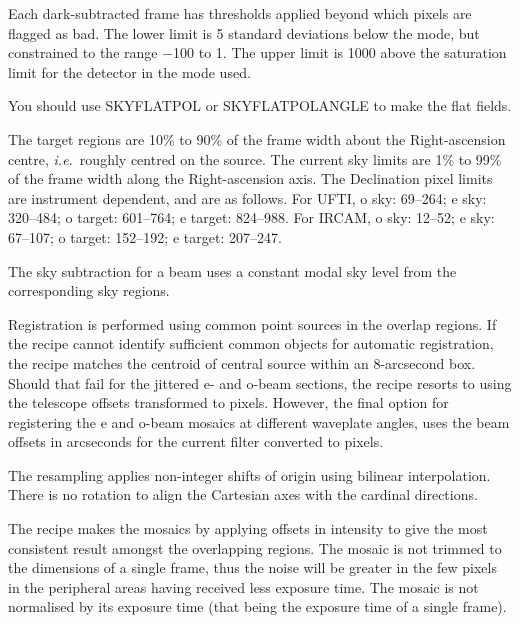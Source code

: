 \documentclass[twoside,11pt]{article}
\newcommand{\htmlref}[2]{#1}
\renewcommand{\_}{\texttt{\symbol{95}}}
\newcommand{\sstitem}{\item}
\begin{document}
{{{         \sstitem
         Each dark-subtracted frame has thresholds applied beyond which
         pixels are flagged as bad.  The lower limit is 5 standard
         deviations below the mode, but constrained to the range $-$100 to 1.
         The upper limit is 1000 above the saturation limit for the detector
         in the mode used.

         \sstitem
         You should use \htmlref{SKY\_FLAT\_POL}{SKY\_FLAT\_POL} or
         \htmlref{SKY\_FLAT\_POL\_ANGLE}{SKY\_FLAT\_POL\_ANGLE} to make the
         flat fields.

         \sstitem
         The target regions are 10\% to 90\% of the frame width about
         the Right-ascension centre, {\em{i.e.}}\ roughly centred on the source.
         The current sky limits are 1\% to 99\% of the frame width along the
         Right-ascension axis.  The Declination pixel limits are instrument
         dependent, and are as follows.  For UFTI, o sky: 69--264;
         e sky: 320--484; o target: 601--764; e target: 824--988.  For
         IRCAM, o sky: 12--52; e sky: 67--107; o target: 152--192;
         e target: 207--247.

         \sstitem
         The sky subtraction for a beam uses a constant modal sky level
         from the corresponding sky regions.

         \sstitem
         Registration is performed using common point sources in the
         overlap regions.  If the recipe cannot identify sufficient common
         objects for automatic registration, the recipe matches the centroid
         of central source within an 8-arcsecond box.  Should that fail for
         the jittered e- and o-beam sections, the recipe resorts to using the
         telescope offsets transformed to pixels.  However, the final option
         for registering the e and o-beam mosaics at different waveplate
         angles, uses the beam offsets in arcseconds for the current filter
         converted to pixels.

         \sstitem
         The resampling applies non-integer shifts of origin using
         bilinear interpolation.  There is no rotation to align the
         Cartesian axes with the cardinal directions.

         \sstitem
         The recipe makes the mosaics by applying offsets in intensity
         to give the most consistent result amongst the overlapping regions.
         The mosaic is not trimmed to the dimensions of a single frame, thus
         the noise will be greater in the few pixels in the peripheral areas
         having received less exposure time.  The mosaic is not normalised by
         its exposure time (that being the exposure time of a single frame).

}}}
\end{document}
